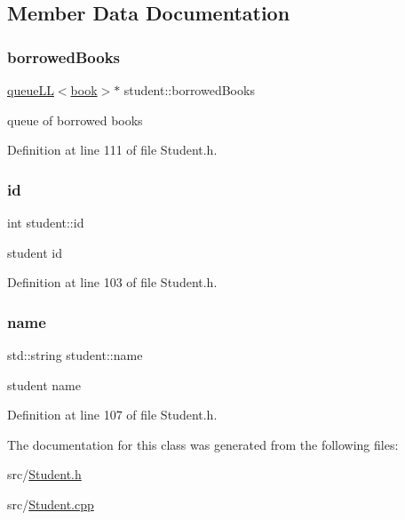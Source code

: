 \subsection{Member Data Documentation}
\mbox{\label{classstudent_ab477f6c1525709586ea41364dc8c568b}} 
\subsubsection{\texorpdfstring{borrowed\+Books}{borrowedBooks}}
{\footnotesize\ttfamily \hyperlink{classqueue_l_l}{queue\+LL}$<$\hyperlink{classbook}{book}$>$$\ast$ student\+::borrowed\+Books\hspace{0.3cm}{\ttfamily [private]}}

queue of borrowed books 

Definition at line 111 of file Student.\+h.

\mbox{\label{classstudent_a8215d11b0d1adc77e0808a0ff4d0f6a2}} 
\subsubsection{\texorpdfstring{id}{id}}
{\footnotesize\ttfamily int student\+::id\hspace{0.3cm}{\ttfamily [private]}}

student id 

Definition at line 103 of file Student.\+h.

\mbox{\label{classstudent_a8bba46a454eaecf8619a68c4c38c7b8d}} 
\subsubsection{\texorpdfstring{name}{name}}
{\footnotesize\ttfamily std\+::string student\+::name\hspace{0.3cm}{\ttfamily [private]}}

student name 

Definition at line 107 of file Student.\+h.



The documentation for this class was generated from the following files\+:\begin{DoxyCompactItemize}
\item 
src/\hyperlink{_student_8h}{Student.\+h}\item 
src/\hyperlink{_student_8cpp}{Student.\+cpp}\end{DoxyCompactItemize}
